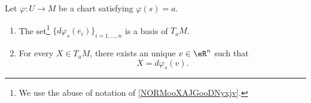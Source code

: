 \begin{proposition}     \label{PROPooKMCGooDEuaWz}
    Let \( \varphi\colon U\to M\) be a chart satisfying \( \varphi(s)=a\). 
    \begin{enumerate}
        \item       \label{ITEMooSFUBooNXgGuu}
            The set\footnote{We use the abuse of notation of \ref{NORMooXAJGooDNyxjv}.} \( \{ d\varphi_s(e_i) \}_{i=1,\ldots, n}\) is a basis of \( T_aM\).
        \item       \label{ITEMooPYPVooKkHrkQ}
            For every \( X\in T_aM\), there exists an unique \( v\in \eR^n\) such that 
            \begin{equation}
                X=d\varphi_{s}(v).
            \end{equation}
    \end{enumerate}
\end{proposition}


